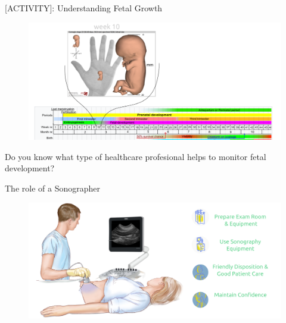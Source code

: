 {
\begin{frame}{[\faUsers ACTIVITY]: Understanding Fetal Growth}
      \begin{figure}
        \centering
        \includegraphics[width=1.0\textwidth]{./../figures/fetal-size/versions/drawing-v02.png}
      \end{figure}
\end{frame}
}



{
\begin{frame}{}

\BigSizeFont
\begin{center}
    Do you know what type of healthcare profesional helps to monitor fetal development?
\end{center}

\end{frame}
}


{
    \begin{frame}{The role of a Sonographer}
      \begin{figure}
        \centering
        \includegraphics[width=1.0\textwidth]{./../figures/sonographer/versions/drawing-v02.png}
      \end{figure}
\end{frame}
}